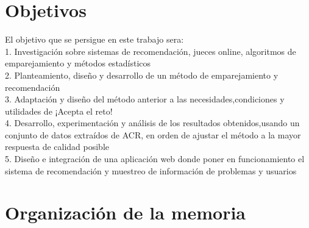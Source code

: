 \section{Objetivos}

El objetivo que se persigue en este trabajo sera: \\
	
	1. Investigación sobre sistemas de recomendación, jueces online, algoritmos de emparejamiento y métodos estadísticos \\
	
	2. Planteamiento, diseño y desarrollo de un método de emparejamiento y recomendación \\
	
	3. Adaptación y diseño del método anterior a las necesidades,condiciones y  utilidades de ¡Acepta el reto! \\
	
	4. Desarrollo, experimentación y análisis de los resultados obtenidos,usando un conjunto de datos extraídos de ACR, en orden de ajustar el método a la mayor respuesta de calidad posible \\
	
	5. Diseño e integración de una aplicación web donde poner en funcionamiento el sistema de recomendación y muestreo de información de problemas y usuarios \\
	
\section{Organización de la memoria}	